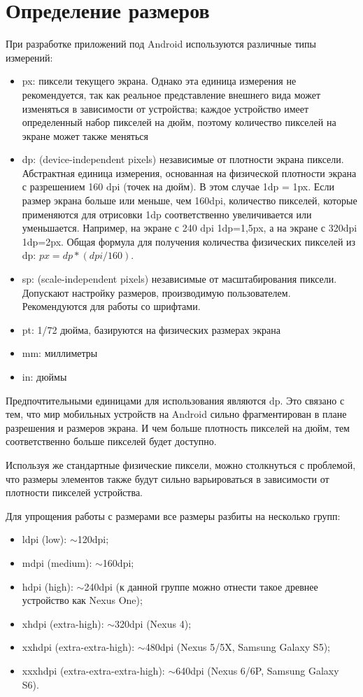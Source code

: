 \section{Определение размеров}
При разработке приложений под Android используются различные
типы измерений:
\begin{itemize}
	\item px: пиксели текущего экрана. Однако эта единица измерения не
		рекомендуется, так как реальное представление внешнего вида
		может изменяться в зависимости от устройства; каждое устройство
		имеет определенный набор пикселей на дюйм, поэтому количество
		пикселей на экране может также меняться
	\item dp: (device-independent pixels) независимые от плотности экрана
		пиксели. Абстрактная единица измерения, основанная на физической
		плотности экрана с разрешением 160 dpi (точек на дюйм).
		В этом случае 1dp = 1px. Если размер экрана больше или меньше,
		чем 160dpi, количество пикселей, которые применяются
		для отрисовки 1dp соответственно увеличивается или уменьшается.
		Например, на экране с 240 dpi 1dp=1,5px, а на экране с 320dpi 1dp=2px.
		Общая формула для получения количества физических пикселей
		из dp: \( px = dp * (dpi / 160) \).
	\item sp: (scale-independent pixels) независимые от масштабирования
		пиксели. Допускают настройку размеров, производимую
		пользователем. Рекомендуются для работы со шрифтами.
	\item pt: 1/72 дюйма, базируются на физических размерах экрана
	\item mm: миллиметры
	\item in: дюймы
\end{itemize}
Предпочтительными единицами для использования являются dp. Это связано
с тем, что мир мобильных устройств на Android сильно фрагментирован в
плане разрешения и размеров экрана. И чем больше плотность пикселей на
дюйм, тем соответственно больше пикселей будет доступно.\par
Используя же стандартные физические пиксели, можно столкнуться с
проблемой, что размеры элементов также будут сильно варьироваться в
зависимости от плотности пикселей устройства.\par
Для упрощения работы с размерами все размеры разбиты на несколько
групп:
\begin{itemize}
	\item ldpi (low): $\sim$120dpi;
	\item mdpi (medium): $\sim$160dpi;
	\item hdpi (high):
		$\sim$240dpi (к данной группе можно отнести такое древнее
		устройство как Nexus One);
	\item xhdpi (extra-high): $\sim$320dpi (Nexus 4);
	\item xxhdpi (extra-extra-high):
		$\sim$480dpi (Nexus 5/5X, Samsung Galaxy S5);
	\item xxxhdpi (extra-extra-extra-high):
		$\sim$640dpi (Nexus 6/6P, Samsung Galaxy S6).
\end{itemize}

